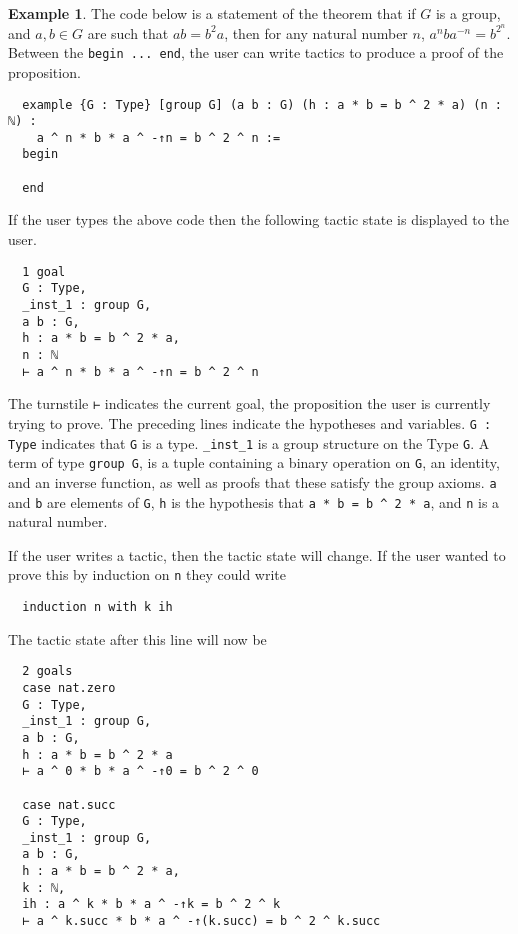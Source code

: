 \documentclass[12pt]{article} %
\theoremstyle{definition}
\theoremstyle{definition}
\theoremstyle{definition}
\theoremstyle{definition}
\theoremstyle{definition}
\theoremstyle{definition}
\newtheorem{exmpl}{Example}[theorem]
\begin{document}
\begin{exmpl}

The code below is a statement of the theorem that if $G$ is a group, and
$a, b ∈ G$ are such that $ab = b^2a$, then for any natural number $n$,
$a^nba^{-n} = b^{2^n}$. Between the \lstinline{begin ... end}, the user can
write tactics to produce a proof of the proposition.

\begin{lstlisting}
  example {G : Type} [group G] (a b : G) (h : a * b = b ^ 2 * a) (n : ℕ) :
    a ^ n * b * a ^ -↑n = b ^ 2 ^ n :=
  begin

  end
\end{lstlisting}
If the user types the above code then the following tactic state is displayed to the user.

\begin{lstlisting}
  1 goal
  G : Type,
  _inst_1 : group G,
  a b : G,
  h : a * b = b ^ 2 * a,
  n : ℕ
  ⊢ a ^ n * b * a ^ -↑n = b ^ 2 ^ n
\end{lstlisting}

The turnstile \lstinline{⊢} indicates the current goal, the proposition the user
is currently trying to prove. The preceding lines indicate the hypotheses and variables.
\lstinline{G : Type} indicates that \lstinline{G} is a type. \lstinline{_inst_1} is a group structure on the Type \lstinline{G}.
A term of type \lstinline{group G}, is a tuple containing a binary operation on
\lstinline{G}, an identity, and an inverse function, as well as proofs that these
satisfy the group axioms. \lstinline{a} and \lstinline{b} are elements of
\lstinline{G}, \lstinline{h} is the hypothesis that \lstinline{a * b = b ^ 2 * a},
and \lstinline{n} is a natural number.

If the user writes a tactic, then the tactic state will change. If the user
wanted to prove this by induction on \lstinline{n} they could write

\begin{lstlisting}
  induction n with k ih
\end{lstlisting}

The tactic state after this line will now be

\begin{lstlisting}
  2 goals
  case nat.zero
  G : Type,
  _inst_1 : group G,
  a b : G,
  h : a * b = b ^ 2 * a
  ⊢ a ^ 0 * b * a ^ -↑0 = b ^ 2 ^ 0

  case nat.succ
  G : Type,
  _inst_1 : group G,
  a b : G,
  h : a * b = b ^ 2 * a,
  k : ℕ,
  ih : a ^ k * b * a ^ -↑k = b ^ 2 ^ k
  ⊢ a ^ k.succ * b * a ^ -↑(k.succ) = b ^ 2 ^ k.succ
\end{lstlisting}


\end{exmpl}
\end{document}
